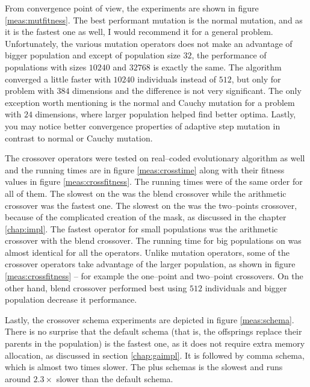 From convergence point of view, the experiments are shown in figure \ref{meas:mutfitness}. The best performant mutation is the normal mutation, and as it is the fastest one as well, I would recommend it for a general problem. Unfortunately, the various mutation operators does not make an advantage of bigger population and except of population size $32$, the performance of populations with sizes $10240$ and $32768$ is exactly the same. The algorithm converged a little faster with $10240$ individuals instead of $512$, but only for problem with $384$ dimensions and the difference is not very significant. The only exception worth mentioning is the normal and Cauchy mutation for a problem with $24$ dimensions, where larger population helped find better optima. Lastly, you may notice better convergence properties of adaptive step mutation in contrast to normal or Cauchy mutation.

The crossover operators were tested on real--coded evolutionary algorithm as well and the running times are in figure \ref{meas:crosstime} along with their fitness values in figure \ref{meas:crossfitness}. The running times were of the same order for all of them. The slowest on the \cpu was the blend crossover while the arithmetic crossover was the fastest one. The slowest on the \cpu was the two--points crossover, because of the complicated creation of the mask, as discussed in the chapter \ref{chap:impl}. The fastest operator for small populations was the arithmetic crossover with the blend crossover. The running time for big populations on \gpu was almost identical for all the operators. Unlike mutation operators, some of the crossover operators take advantage of the larger population, as shown in figure \ref{meas:crossfitness} -- for example the one--point and two--point crossovers. On the other hand, blend crossover performed best using $512$ individuals and bigger population decrease it performance.

Lastly, the crossover schema experiments are depicted in figure \ref{meas:schema}. There is no surprise that the default schema (that is, the offsprings replace their parents in the population) is the fastest one, as it does not require extra memory allocation, as discussed in section \ref{chap:gaimpl}. It is followed by comma schema, which is almost two times slower. The plus schemas is the slowest and runs around $2.3\times$ slower than the default schema.

